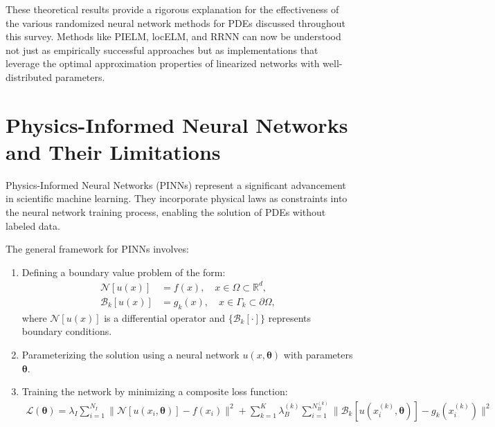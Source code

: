 \documentclass[11pt]{article}
\begin{document}
These theoretical results provide a rigorous explanation for the effectiveness of the various randomized neural network methods for PDEs discussed throughout this survey. Methods like PIELM, locELM, and RRNN can now be understood not just as empirically successful approaches but as implementations that leverage the optimal approximation properties of linearized networks with well-distributed parameters.

\section{Physics-Informed Neural Networks and Their Limitations}

Physics-Informed Neural Networks (PINNs) represent a significant advancement in scientific machine learning. They incorporate physical laws as constraints into the neural network training process, enabling the solution of PDEs without labeled data. 

The general framework for PINNs involves:
\begin{enumerate}
    \item Defining a boundary value problem of the form:
    \begin{align}
        \mathcal{N}[u(x)] &= f(x), \quad x \in \Omega \subset \mathbb{R}^d, \\
        \mathcal{B}_k[u(x)] &= g_k(x), \quad x \in \Gamma_k \subset \partial\Omega,
    \end{align}
    where $\mathcal{N}[u(x)]$ is a differential operator and $\{\mathcal{B}_k[\cdot]\}$ represents boundary conditions.
    
    \item Parameterizing the solution using a neural network $u(x,\boldsymbol{\theta})$ with parameters $\boldsymbol{\theta}$.
    
    \item Training the network by minimizing a composite loss function:
    \begin{align}
        \mathcal{L}(\boldsymbol{\theta}) = \lambda_I \sum_{i=1}^{N_I} \|\mathcal{N}[u(x_i,\boldsymbol{\theta})]-f(x_i)\|^2 + \sum_{k=1}^{K}\lambda_B^{(k)} \sum_{i=1}^{N_B^{(k)}} \|\mathcal{B}_k[u(x_i^{(k)},\boldsymbol{\theta})]-g_k(x_i^{(k)})\|^2
    \end{align}
\end{enumerate}
\end{document}
